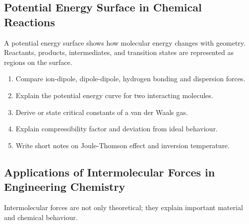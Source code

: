 \documentclass[12pt,a4paper]{article}
\begin{document}
\subsection{Potential Energy Surface in Chemical Reactions}
A potential energy surface shows how molecular energy changes with geometry. Reactants, products, intermediates, and transition states are represented as regions on the surface.

\begin{tcolorbox}[tikzbox, title={Reaction Path on a Potential Energy Surface}]
\centering
{}
\end{tcolorbox}

\begin{tcolorbox}[masonbox, title={Previous-Year Style Questions}]
\begin{enumerate}[leftmargin=*, itemsep=4pt, topsep=2pt]
  \item Compare ion-dipole, dipole-dipole, hydrogen bonding and dispersion forces.
  \item Explain the potential energy curve for two interacting molecules.
  \item Derive or state critical constants of a van der Waals gas.
  \item Explain compressibility factor and deviation from ideal behaviour.
  \item Write short notes on Joule-Thomson effect and inversion temperature.
\end{enumerate}
\end{tcolorbox}

\subsection{Applications of Intermolecular Forces in Engineering Chemistry}
Intermolecular forces are not only theoretical; they explain important material and chemical behaviour.
\end{document}
